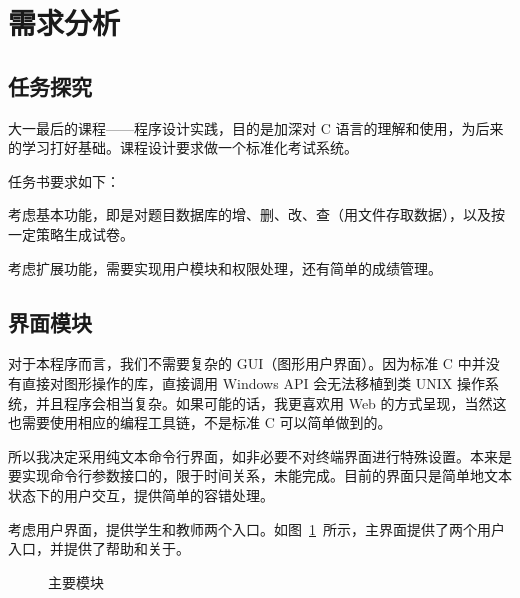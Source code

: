 \section{需求分析}

\subsection{任务探究}

大一最后的课程——程序设计实践，目的是加深对 C 语言的理解和使用，为后来的学习打好基础。课程设计要求做一个标准化考试系统。

任务书要求如下：
\begin{quote}\small
\tasktext
\end{quote}

考虑基本功能，即是对题目数据库的增、删、改、查（用文件存取数据），以及按一定策略生成试卷。

考虑扩展功能，需要实现用户模块和权限处理，还有简单的成绩管理。

\subsection{界面模块}

对于本程序而言，我们不需要复杂的 GUI（图形用户界面）。因为标准 C 中并没有直接对图形操作的库，直接调用 Windows API 会无法移植到类 UNIX 操作系统，并且程序会相当复杂。如果可能的话，我更喜欢用 Web 的方式呈现，当然这也需要使用相应的编程工具链，不是标准 C 可以简单做到的。

所以我决定采用纯文本命令行界面，如非必要不对终端界面进行特殊设置。本来是要实现命令行参数接口的，限于时间关系，未能完成。目前的界面只是简单地文本状态下的用户交互，提供简单的容错处理。

考虑用户界面，提供学生和教师两个入口。如图~\ref{al_main}~所示，主界面提供了两个用户入口，并提供了帮助和关于。

\begin{figure}[htp]
\pictext
\caption{\label{al_main}主要模块}  
\end{figure}

